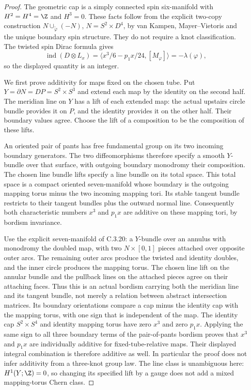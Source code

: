 \begin{proof}
The geometric cap is a simply connected spin six-manifold with
$H^2=H^4=\Z$ and $H^3=0$. These facts follow from the explicit
two-copy construction $N\cup_{\widetilde\varphi}(-N)$,
$N=S^2\times D^4$, by van Kampen, Mayer--Vietoris and the
unique boundary spin structure. They do not require a knot
classification. The twisted spin Dirac formula gives
\[
 \operatorname{ind}(D\otimes L_x)
 =\langle x^3/6-p_1x/24,[M_\varphi]\rangle
 =-\lambda(\varphi),
\]
so the displayed quantity is an integer.

We first prove additivity for maps fixed on the chosen tube.
Put $Y=\partial N=DP=S^2\times S^3$ and extend each map by
the identity on the second half. The meridian line on $Y$ has
a lift of each extended map: the actual upstairs circle bundle
provides it on $P$, and the identity provides it on the other
half. Their boundary values agree. Choose the lift of a
composition to be the composition of these lifts.

An oriented pair of pants has free fundamental group on its
two incoming boundary generators. The two diffeomorphisms
therefore specify a smooth $Y$-bundle over that surface, with
outgoing boundary monodromy their composition. The chosen line
bundle lifts specify a line bundle on its total space. This
total space is a compact oriented seven-manifold whose boundary
is the outgoing mapping torus minus the two incoming mapping
tori. Its stable tangent bundle restricts to their tangent
bundles plus the outward normal line. Consequently both
characteristic numbers $x^3$ and $p_1x$ are additive on these
mapping tori, by bordism invariance.

Use the explicit seven-manifold of C.3.20: a $Y$-bundle over
an annulus with monodromy the doubled map, with two
$N\times[0,1]$ pieces attached over opposite outer arcs.
The remaining outer arcs produce the twisted and identity
doubles, and the inner circle produces the mapping torus.
The chosen line lift on the annular bundle and the pullback
lines on the attached pieces agree on their attaching faces.
Thus this is an actual bordism carrying both the meridian line
and its tangent bundle, not merely a relation between abstract
intersection matrices. Its boundary orientations compare a cap
minus the identity cap with the mapping torus, with one sign
that is independent of the map. The identity cap
$S^2\times S^4$ and identity mapping torus have zero $x^3$
and zero $p_1x$. Applying the same sign to all three boundary
terms of the pair-of-pants bordism proves that $x^3$ and $p_1x$
are individually additive for fixed-tube-relative maps. Their
displayed integral combination is therefore additive as well.
In particular the proof does not infer additivity from a
three-knot group law. The line class is unambiguous here:
$H^1(Y;\Z)=0$, so changing its specified lift by a gauge does
not add a mixed mapping-torus Chern class.


\end{proof}
